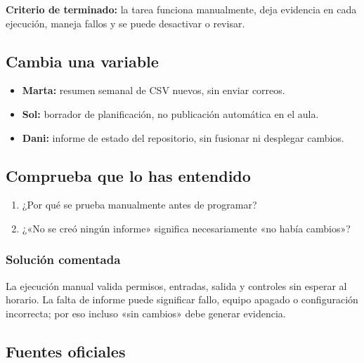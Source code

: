 \documentclass[10pt,a4paper,openany]{book}
\providecommand{\tightlist}{\setlength{\itemsep}{0.18em}\setlength{\parskip}{0pt}}
\begin{document}
\begin{successbox}

\textbf{Criterio de terminado:} la tarea funciona manualmente, deja
evidencia en cada ejecución, maneja fallos y se puede desactivar o
revisar.

\end{successbox}

\subsection{Cambia una variable}\label{cambia-una-variable-17}

\begin{itemize}
\tightlist
\item
  \textbf{Marta:} resumen semanal de CSV nuevos, sin enviar correos.
\item
  \textbf{Sol:} borrador de planificación, no publicación automática en
  el aula.
\item
  \textbf{Dani:} informe de estado del repositorio, sin fusionar ni
  desplegar cambios.
\end{itemize}

\subsection{Comprueba que lo has
entendido}\label{comprueba-que-lo-has-entendido-17}

\begin{enumerate}
\def\labelenumi{\arabic{enumi}.}
\tightlist
\item
  ¿Por qué se prueba manualmente antes de programar?
\item
  ¿«No se creó ningún informe» significa necesariamente «no había
  cambios»?
\end{enumerate}

\subsubsection{Solución comentada}\label{soluciuxf3n-comentada-19}

La ejecución manual valida permisos, entradas, salida y controles sin
esperar al horario. La falta de informe puede significar fallo, equipo
apagado o configuración incorrecta; por eso incluso «sin cambios» debe
generar evidencia.

\subsection{Fuentes oficiales}\label{fuentes-oficiales-17}
\end{document}
